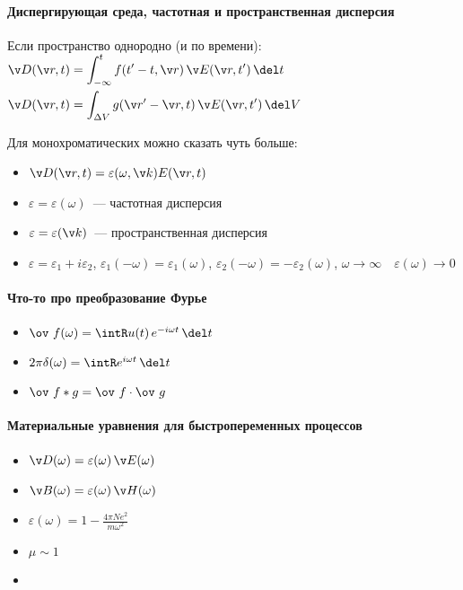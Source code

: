 \documentclass[draft]{trchesh}
\begin{document}
\begin{multicols*}{3}
\paragraph{Диспергирующая среда, частотная и пространственная дисперсия}
Если пространство однородно (и по времени): \\
$\begin{aligned}
  \v D (\v r,t) &= \int_{-\infty}^t f (t' - t, \v r)\,\v E(\v r, t')\, \del t \\
  \v D (\v r,t) &= \int_{\Delta V} g(\v r' -\v r, t)\,\v E(\v r, t')\, \del V
\end{aligned}$\par\vspace{1ex}
Для монохроматических можно сказать  чуть  больше:
\begin{itemize}
  \item $\v D(\v r,t) = \varepsilon (\omega,\v k) E(\v r,t)$
  \item $\varepsilon = \varepsilon(\omega)$~--- частотная дисперсия
  \item $\varepsilon = \varepsilon(\v k)$~--- пространственная дисперсия
  \item $\varepsilon = \varepsilon_1 + i \varepsilon _2$, 
    $\varepsilon_1(-\omega) = \varepsilon_1(\omega)$, $\varepsilon_2(-\omega) = -\varepsilon_2(\omega)$,
    $\omega \to \infty \quad \varepsilon(\omega) \to 0$
\end{itemize}

\paragraph{Что-то про преобразование Фурье}
\begin{itemize}
  \item $\ov~f(\omega) = \intR u(t)\, e^{-i \omega t} \, \del t$
  \item $2 \pi \delta(\omega) = \intR e^{i \omega t} \, \del t$
  \item $\ov~{f\ast g} = \ov~{f} \cdot \ov~{\vphantom{f}g}$
\end{itemize}

\paragraph{Материальные уравнения для быстропеременных процессов}
\begin{itemize}
  \item $\v D(\omega) = \varepsilon(\omega) \, \v E(\omega)$
  \item $\v B(\omega) = \varepsilon(\omega) \, \v H(\omega)$
  \item $\varepsilon (\omega) = 1 - \frac{4 \pi N e^2}{m \omega^2}$
  \item $\mu \sim 1$
  \item \underdev
\end{itemize}


\end{multicols*}
\end{document}
